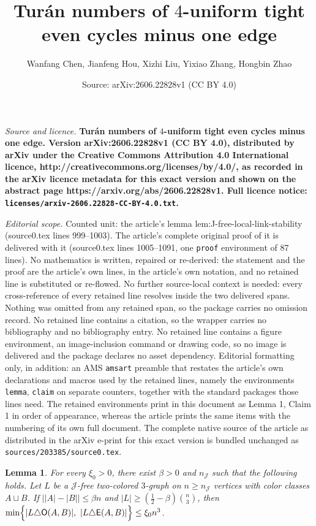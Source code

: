 \documentclass[10pt,a4paper]{amsart}
\title{\bf\Large Tur\'{a}n numbers of $4$-uniform tight even cycles minus one edge}
\author{Wanfang Chen, Jianfeng Hou, Xizhi Liu, Yixiao Zhang, Hongbin Zhao}
\date{Source: arXiv:2606.22828v1 (CC BY 4.0)}
\newtheorem{lemma}{Lemma}
\begin{document}
\maketitle

\noindent\emph{Source and licence.} \bf\Large Tur\'{a}n numbers of $4$-uniform tight even cycles minus one edge. Version arXiv:2606.22828v1 (CC BY 4.0), distributed by arXiv under the Creative Commons Attribution 4.0 International licence, http://creativecommons.org/licenses/by/4.0/, as recorded in the arXiv licence metadata for this exact version and shown on the abstract page https://arxiv.org/abs/2606.22828v1. Full licence notice: \texttt{licenses/arxiv-2606.22828-CC-BY-4.0.txt}.\par\smallskip

\noindent\textit{Editorial scope.} Counted unit: the article's lemma lem:J-free-local-link-stability (source0.tex lines 999--1003). The article's complete original proof of it is delivered with it (source0.tex lines 1005--1091, one \texttt{proof} environment of 87 lines). No mathematics is written, repaired or re-derived: the statement and the proof are the article's own lines, in the article's own notation, and no retained line is substituted or re-flowed.  No further source-local context is needed: every cross-reference of every retained line resolves inside the two delivered spans.  Nothing was omitted from any retained span, so the package carries no omission record.  No retained line contains a citation, so the wrapper carries no bibliography and no bibliography entry.  No retained line contains a figure environment, an image-inclusion command or drawing code, so no image is delivered and the package declares no asset dependency.  Editorial formatting only, in addition: an AMS \texttt{amsart} preamble that restates the article's own declarations and macros used by the retained lines, namely the environments \texttt{lemma}, \texttt{claim} on separate counters, together with the standard packages those lines need.  The retained environments print in this document as Lemma 1, Claim 1 in order of appearance, whereas the article prints the same items with the numbering of its own full document.  The complete native source of the article as distributed in the arXiv e-print for this exact version is bundled unchanged as \texttt{sources/203385/source0.tex}.
\begin{lemma}\label{lem:J-free-local-link-stability}
For every $\xi_0>0$, there exist $\beta>0$ and $n_{\mathcal J}$ such that the following holds.
Let $L$ be a $\mathcal J$-free two-colored $3$-graph on $n\ge n_{\mathcal J}$ vertices with color classes $A\sqcup B$.
If $\bigl||A|-|B|\bigr|\le \beta n$ and $|L|\ge \left(\frac12-\beta\right)\binom n3$, then $\min\Bigl\{|L\triangle \mathsf O(A,B)|,\ |L\triangle \mathsf E(A,B)|\Bigr\} \le \xi_0 n^3$. 
\end{lemma}
\end{document}
